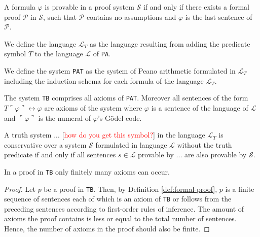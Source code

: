 \begin{definition}[provability]
    \label{def:provable-pa}
    A formula $\varphi$ is provable in a proof system $\mathcal{S}$ if and only if there exists a formal proof $\mathcal{P}$ in $\mathcal{S}$, such that $\mathcal{P}$ contains no assumptions and $\varphi$ is the last sentence of $\mathcal{P}$.
\end{definition}

\begin{definition}[$\mathcal{L}_T$]
    \label{def:LT}
    We define the language $\mathcal{L}_T$ as the language resulting from adding the predicate symbol $T$ to the language $\mathcal{L}$ of \texttt{PA}. 
\end{definition}

\begin{definition}
    \label{def:PAT}
    We define the system \texttt{PAT} as the system of Peano arithmetic formulated in $\mathcal{L}_T$ including the induction schema for each formula of the language $\mathcal{L}_T$.
\end{definition}

\begin{definition}[\texttt{TB}]
    \label{def:TB}
    The system \texttt{TB} comprises all axioms of \texttt{PAT}. Moreover all sentences of the form $T\ulcorner\varphi\urcorner \leftrightarrow \varphi$ are axioms of the system where $\varphi$ is a sentence of the language of $\mathcal{L}$ and $\ulcorner \varphi \urcorner$ is the numeral of $\varphi$'s Gödel code.
\end{definition}

\begin{definition}[conservativity]
    \label{def:cons}
    A truth system $...$ [\textcolor{red}{how do you get this symbol?}] in the language $\mathcal{L}_T$ is conservative over a system $\mathcal{S}$ formulated in language $\mathcal{L}$ without the truth predicate if and only if all sentences $s \in \mathcal{L}$ provable by $...$ are also provable by $\mathcal{S}$.
\end{definition}

\begin{lemma}
    \label{lem:finit-ax-tb}
    In a proof in \texttt{TB} only finitely many axioms can occur.
\end{lemma}

\begin{proof}
    Let $p$ be a proof in \texttt{TB}. Then, by Definition \ref{def:formal-proof}, $p$ is a finite sequence of sentences each of which is an axiom of \texttt{TB} or follows from the preceding sentences according to first-order rules of inference. The amount of axioms the proof contains is less or equal to the total number of sentences. Hence, the number of axioms in the proof should also be finite. 
\end{proof}

